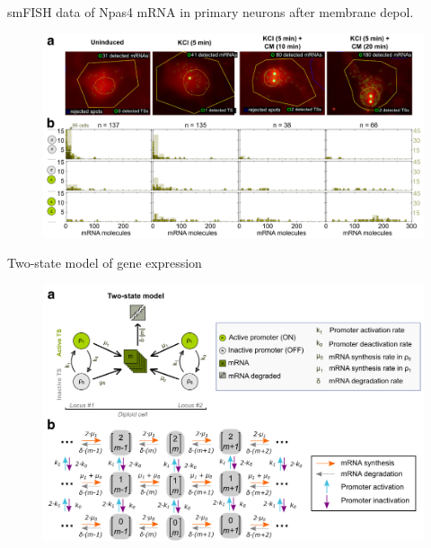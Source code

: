 \documentclass[aspectratio=1610]{beamer}					%
\begin{document}
\begin{frame}{smFISH data of Npas4 mRNA in primary neurons after membrane depol.}

\begin{figure}
\includegraphics[width=14cm]{figure-1.png}
\end{figure}

\end{frame}

\begin{frame}{Two-state model of gene expression}

\begin{figure}
\includegraphics[width=12cm]{figure-2.png}
\end{figure}

\end{frame}
\end{document}
